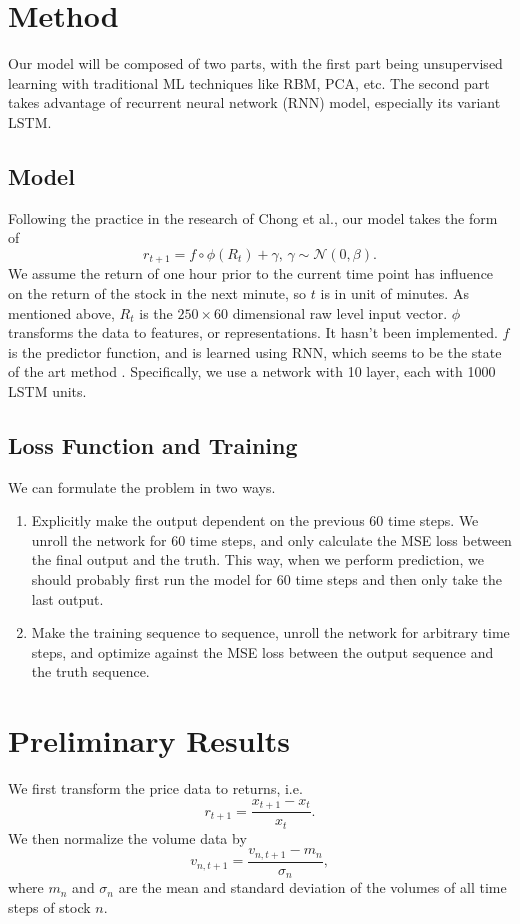 \documentclass{article}
\begin{document}
\section{Method}
Our model will be composed of two parts, with the first part being unsupervised learning with traditional ML techniques like RBM, PCA, etc. The second part takes advantage of recurrent neural network (RNN) model, especially its variant LSTM. 

\subsection{Model}

Following the practice in the research of Chong et al.\cite{Chong2017}, our model takes the form of
\[r_{t+1}=f\circ\phi(R_t)+\gamma,\,\gamma\sim\mathcal{N}(0,\beta).\]
We assume the return of one hour prior to the current time point has influence on the return of the stock in the next minute, so $t$ is in unit of minutes. As mentioned above, $R_t$ is the $250\times 60$ dimensional raw level input vector. $\phi$ transforms the data to features, or representations. It hasn't been implemented. $f$ is the predictor function, and is learned using RNN, which seems to be the state of the art method \cite{Abe2018}. Specifically, we use a network with 10 layer, each with 1000 LSTM units.

\subsection{Loss Function and Training}
We can formulate the problem in two ways.
\begin{enumerate}
	\item Explicitly make the output dependent on the previous 60 time steps. We unroll the network for 60 time steps, and only calculate the MSE loss between the final output and the truth. This way, when we perform prediction, we should probably first run the model for 60 time steps and then only take the last output.
	\item Make the training sequence to sequence, unroll the network for arbitrary time steps, and optimize against the MSE loss between the output sequence and the truth sequence.
\end{enumerate}
 
\section{Preliminary Results} 
We first transform the price data to returns, i.e.
\[r_{t+1} = \frac{x_{t+1}-x_{t}}{x_{t}}.\]
We then normalize the volume data by
\[v_{n,t+1} = \frac{v_{n,t+1}-m_{n}}{\sigma_{n}},\]
where $m_n$ and $\sigma_n$ are the mean and standard deviation of the volumes of all time steps of stock $n$.
\end{document}
